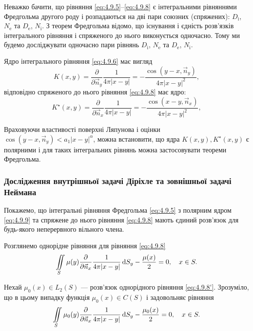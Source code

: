 Неважко бачити, що рівняння \eqref{eq:4.9.5}--\eqref{eq:4.9.8} є інтегральними рівняннями Фредгольма другого роду і розпадаються на дві пари союзних (спряжених): $D_{\text{i}}$, $N_{\text{e}}$ та $D_{\text{e}}$, $N_{\text{i}}$. З теорем Фредгольма відомо, що існування і єдність розв'язків інтегрального рівняння і спряженого до нього виконується одночасно. Тому ми будемо досліджувати одночасно пари рівнянь $D_{\text{i}}$, $N_{\text{e}}$ та $D_{\text{e}}$, $N_{\text{i}}$. \medskip

Ядро інтегрального рівняння \eqref{eq:4.9.6} має вигляд
\begin{equation}
	\label{eq:4.9.9}
	K(x, y) = \frac{\partial}{\partial \vec n_y} \frac{1}{4 \pi |x - y|} = - \frac{\cos(y - x, \vec n_y)}{4 \pi |x - y|^2},
\end{equation}
відповідно спряженого до нього рівняння \eqref{eq:4.9.8} має ядро:
\begin{equation}
	\label{eq:4.9.10}
	K^\star(x, y) = \frac{\partial}{\partial \vec n_x} \frac{1}{4 \pi |x - y|} = - \frac{\cos(x - y, \vec n_x)}{4 \pi |x - y|^2},
\end{equation}

Враховуючи властивості поверхні Ляпунова і оцінки $\cos(y - x, \vec n_y) < a_1 |x - y|^\alpha$, можна встановити, що ядра $K(x, y), K^\star(x, y)$ є полярними і для таких інтегральних рівнянь можна застосовувати теореми Фредгольма.

\subsubsection{Дослідження внутрішньої задачі Діріхле та зовнішньої задачі Неймана}

Покажемо, що інтегральні рівняння Фредгольма \eqref{eq:4.9.5} з полярним ядром \eqref{eq:4.9.9} та спряжене до нього рівняння \eqref{eq:4.9.8} мають єдиний розв'язок для будь-якого неперервного вільного члена. \medskip

Розглянемо однорідне рівняння для рівняння \eqref{eq:4.9.8} 
\begin{equation}
	\label{eq:4.9.8'}
	\displaystyle\iint\limits_S \mu(y) \frac{\partial}{\partial \vec n_x} \frac{1}{4 \pi |x - y|} \mathop{}\!\mathrm{d} S_y - \frac{\mu(x)}{2} = 0, \quad x \in S.
\end{equation}

Нехай $\mu_0(x) \in L_2(S)$ ---  розв'язок однорідного рівняння \eqref{eq:4.9.8'}. Зрозуміло, що в цьому випадку функція $\mu_0(x) \in C(S)$ і задовольняє рівняння
\begin{equation}
	\label{eq:4.9.8''}
	\displaystyle\iint\limits_S \mu_0(y) \frac{\partial}{\partial \vec n_x} \frac{1}{4 \pi |x - y|} \mathop{}\!\mathrm{d} S_y - \frac{\mu_0(x)}{2} = 0, \quad x \in S.
\end{equation}

